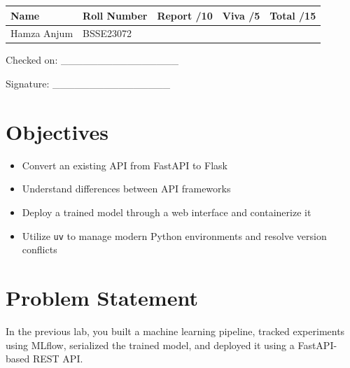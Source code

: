 \documentclass[12pt,a4paper]{article}
\begin{document}
\renewcommand{\arraystretch}{2.0}
\begin{tabularx}{\textwidth}{|Y|Y|Y|Y|Y|}
\hline
\textbf{Name} & \textbf{Roll Number} & \textbf{Report /10} & \textbf{Viva /5} & \textbf{Total /15} \\
\hline
Hamza Anjum & BSSE23072 & & & \\
\hline
\end{tabularx}
\renewcommand{\arraystretch}{1.0}

\vspace{12pt}

\begin{flushright}
Checked on: \_\_\_\_\_\_\_\_\_\_\_\_\_\_\_\_

\vspace{6pt}
Signature: \_\_\_\_\_\_\_\_\_\_\_\_\_\_\_\_
\end{flushright}

\newpage


\section*{Objectives}

\begin{itemize}
\item Convert an existing API from FastAPI to Flask
\item Understand differences between API frameworks
\item Deploy a trained model through a web interface and containerize it
\item Utilize \texttt{uv} to manage modern Python environments and resolve version conflicts
\end{itemize}


\section*{Problem Statement}

In the previous lab, you built a machine learning pipeline, tracked experiments using MLflow, serialized the trained model, and deployed it using a FastAPI-based REST API.
\end{document}
